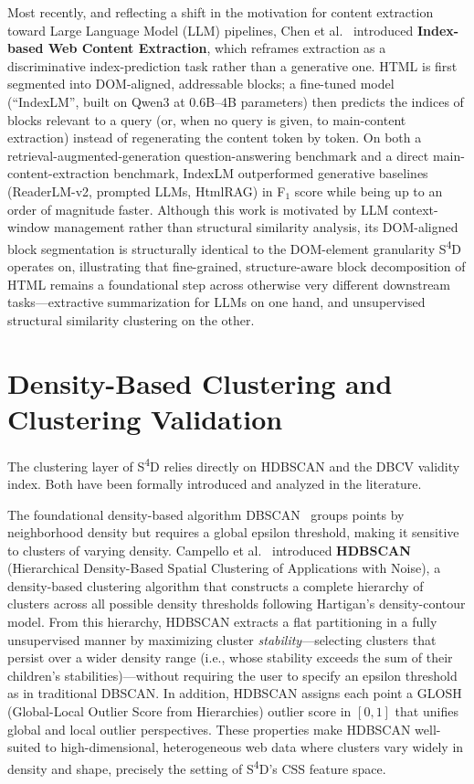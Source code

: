 Most recently, and reflecting a shift in the motivation for content extraction toward Large Language Model (LLM) pipelines, Chen et al.~\cite{chen2025indexlm} introduced \textbf{Index-based Web Content Extraction}, which reframes extraction as a discriminative index-prediction task rather than a generative one. HTML is first segmented into DOM-aligned, addressable blocks; a fine-tuned model (``IndexLM'', built on Qwen3 at 0.6B--4B parameters) then predicts the indices of blocks relevant to a query (or, when no query is given, to main-content extraction) instead of regenerating the content token by token. On both a retrieval-augmented-generation question-answering benchmark and a direct main-content-extraction benchmark, IndexLM outperformed generative baselines (ReaderLM-v2, prompted LLMs, HtmlRAG) in F$_1$ score while being up to an order of magnitude faster. Although this work is motivated by LLM context-window management rather than structural similarity analysis, its DOM-aligned block segmentation is structurally identical to the DOM-element granularity S\textsuperscript{4}D operates on, illustrating that fine-grained, structure-aware block decomposition of HTML remains a foundational step across otherwise very different downstream tasks---extractive summarization for LLMs on one hand, and unsupervised structural similarity clustering on the other.

\section{Density-Based Clustering and Clustering Validation}
\label{sec:clustering}

The clustering layer of S\textsuperscript{4}D relies directly on HDBSCAN and the DBCV validity index. Both have been formally introduced and analyzed in the literature.

The foundational density-based algorithm DBSCAN~\cite{ester1996density} groups points by neighborhood density but requires a global epsilon threshold, making it sensitive to clusters of varying density. Campello et al.~\cite{campello2015hdbscan} introduced \textbf{HDBSCAN} (Hierarchical Density-Based Spatial Clustering of Applications with Noise), a density-based clustering algorithm that constructs a complete hierarchy of clusters across all possible density thresholds following Hartigan's density-contour model. From this hierarchy, HDBSCAN extracts a flat partitioning in a fully unsupervised manner by maximizing cluster \emph{stability}---selecting clusters that persist over a wider density range (i.e., whose stability exceeds the sum of their children's stabilities)---without requiring the user to specify an epsilon threshold as in traditional DBSCAN. In addition, HDBSCAN assigns each point a GLOSH (Global-Local Outlier Score from Hierarchies) outlier score in $[0,1]$ that unifies global and local outlier perspectives. These properties make HDBSCAN well-suited to high-dimensional, heterogeneous web data where clusters vary widely in density and shape, precisely the setting of S\textsuperscript{4}D's CSS feature space.

